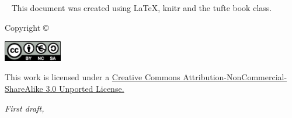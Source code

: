 \begin{fullwidth}
~\vfill
\thispagestyle{empty}
\setlength{\parindent}{0pt}
\setlength{\parskip}{\baselineskip}
This document was created using \LaTeX, knitr and the tufte book class.


Copyright \copyright\ \the\year\ \thanklessauthor


\leavevmode
\includegraphics[width=1in]{graphics/license.png}
\label{fig:cc}

\scriptsize{This work is licensed under a \href{http://creativecommons.org/licenses/by-nc-sa/3.0/deed.en_US}{Creative Commons Attribution-NonCommercial-ShareAlike 3.0 Unported License.}}


\par\textit{First draft, \monthyear}
\end{fullwidth} 
